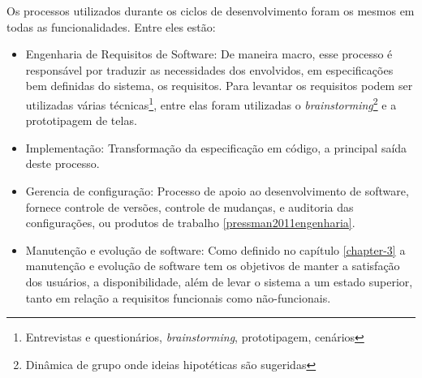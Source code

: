 Os processos utilizados durante os ciclos de desenvolvimento foram os mesmos em todas as funcionalidades. Entre eles estão: 

\begin{itemize}
\item Engenharia de Requisitos de Software: De maneira macro, esse processo é responsável por traduzir as necessidades dos envolvidos, em especificações bem definidas do sistema, os requisitos. Para levantar os requisitos podem ser utilizadas várias técnicas\footnote{Entrevistas e questionários, \textit{brainstorming}, prototipagem, cenários}, entre elas foram utilizadas o \textit{brainstorming}\footnote{Dinâmica de grupo onde ideias hipotéticas são sugeridas} e a prototipagem de telas.
\item Implementação: Transformação da especificação em código, a principal saída deste processo.
\item Gerencia de configuração: Processo de apoio ao desenvolvimento de software, fornece controle de versões, controle de mudanças, e auditoria das configurações, ou produtos de trabalho \ref{pressman2011engenharia}.
\item Manutenção e evolução de software: Como definido no capítulo \ref{chapter-3} a manutenção e evolução de software tem os objetivos de manter a satisfação dos usuários, a disponibilidade, além de levar o sistema a um estado superior, tanto em relação a requisitos funcionais como não-funcionais.
\end{itemize}







